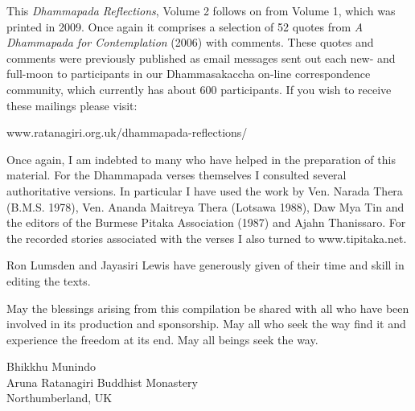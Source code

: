 
This \emph{Dhammapada Reflections}, Volume 2 follows on from Volume 1, which was printed in 2009. Once again it comprises a selection of 52 quotes from \emph{A Dhammapada for Contemplation} (2006) with comments. These quotes and comments were previously published as email messages sent out each new- and full-moon to participants in our Dhammasakaccha on-line correspondence community, which currently has about 600 participants. If you wish to receive these mailings please visit:

\vspace*{0.2\baselineskip}
{\centering
www.ratanagiri.org.uk/dhammapada-reflections/

}
\vspace*{0.2\baselineskip}

Once again, I am indebted to many who have helped in the preparation of this material. For the Dhammapada verses themselves I consulted several authoritative versions. In particular I have used the work by Ven. Narada Thera (B.M.S. 1978), Ven. Ananda Maitreya Thera (Lotsawa 1988), Daw Mya Tin and the editors of the Burmese Pitaka Association (1987) and Ajahn Thanissaro. For the recorded stories associated with the verses I also turned to www.tipitaka.net. 

Ron Lumsden and Jayasiri Lewis have generously given of their time and skill in editing the texts.

May the blessings arising from this compilation be shared with all who have been involved in its production and sponsorship.  May all who seek the way find it and experience the freedom at its end. May all beings seek the way.

{\par\raggedleft
Bhikkhu Munindo\\
Aruna Ratanagiri Buddhist Monastery\\
Northumberland, UK
\par}

